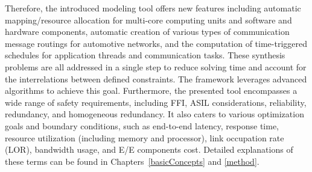     	
    	
    	
    	Therefore, the introduced modeling tool offers new features including automatic mapping/resource allocation for multi-core computing units and software and hardware components, automatic creation of various types of communication message routings for automotive networks, and the computation of time-triggered schedules for application threads and communication tasks. %
    	These synthesis problems are all addressed in a single step to reduce solving time and account for the interrelations between defined constraints. The framework leverages advanced algorithms to achieve this goal.
	    Furthermore, the presented tool encompasses a wide range of safety requirements, including FFI, ASIL considerations, reliability, redundancy, and homogeneous redundancy. It also caters to various optimization goals and boundary conditions, such as end-to-end latency, response time, resource utilization (including memory and processor), link occupation rate (LOR), bandwidth usage, and E/E components cost. Detailed explanations of these terms can be found in Chapters~\ref{basicConcepts} and \ref{method}.
	    
	    
	
	    
